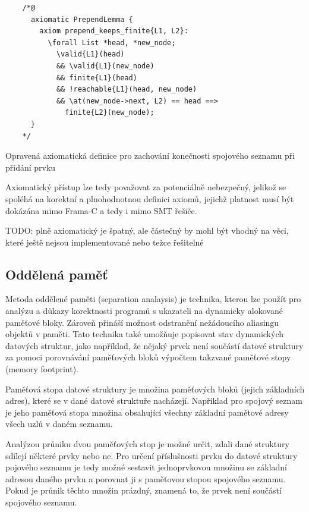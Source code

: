 \begin{listing}[H]
    \begin{verbatim}
    /*@
      axiomatic PrependLemma {
        axiom prepend_keeps_finite{L1, L2}:
          \forall List *head, *new_node;
            \valid{L1}(head)
            && \valid{L1}(new_node)
            && finite{L1}(head)
            && !reachable{L1}(head, new_node)
            && \at(new_node->next, L2) == head ==>
              finite{L2}(new_node);
      }
    */
    \end{verbatim}
    \caption{Opravená axiomatická definice pro zachování konečnosti spojového seznamu při přidání prvku}
    \label{list:linked-list-axiom-prepend-fixed}
\end{listing}

Axiomatický přístup lze tedy považovat za potenciálně nebezpečný,
jelikož se spoléhá na korektní a plnohodnotnou definici axiomů,
jejichž platnost musí být dokázána mimo Frama\mbox{-}C a tedy i mimo SMT řešiče.

TODO: plně axiomatický je špatný, ale částečný by mohl být vhodný na věci, které ještě nejsou implementované nebo težce řešitelné

\subsection{Oddělená paměť}
\label{subsec:oddelena-pamet}

Metoda oddělené paměti (separation analaysis) je technika,
kterou lze použít pro analýzu a důkazy korektnosti programů
s ukazateli na dynamicky alokované paměťové bloky.
Zároveň přináší možnost odstranění nežádoucího aliasingu
objektů v paměti.
Tato technika také umožňuje popisovat stav dynamických datových struktur,
jako například, že nějaký prvek není součástí datové struktury
za pomoci porovnávání paměťových bloků výpočtem takzvané paměťové stopy (memory footprint).

Paměťová stopa datové struktury je množina paměťových bloků (jejich základních adres),
které se v dané datové struktuře nacházejí.
Například pro spojový seznam je jeho paměťová stopa množina
obsahující všechny základní pamětové adresy všech uzlů v daném seznamu.

Analýzou průniku dvou paměťových stop je možné určit,
zdali dané struktury sdílejí některé prvky nebo ne.
Pro určení příslušnosti prvku do datové struktury pojového seznamu
je tedy možné sestavit jednoprvkovou množinu se základní adresou daného prvku
a porovnat ji s paměťovou stopou spojového seznamu.
Pokud je průnik těchto množin prázdný,
znamená to, že prvek není součástí spojového seznamu.

